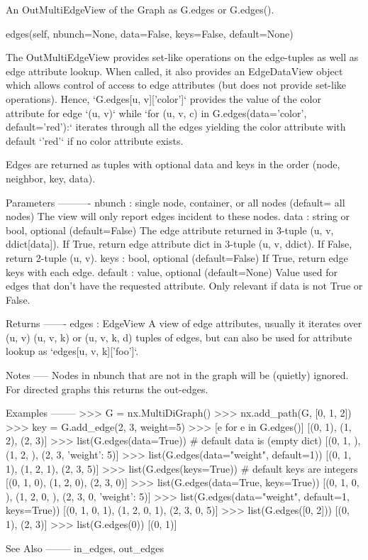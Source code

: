 \begin{DoxyVerb}An OutMultiEdgeView of the Graph as G.edges or G.edges().

edges(self, nbunch=None, data=False, keys=False, default=None)

The OutMultiEdgeView provides set-like operations on the edge-tuples
as well as edge attribute lookup. When called, it also provides
an EdgeDataView object which allows control of access to edge
attributes (but does not provide set-like operations).
Hence, `G.edges[u, v]['color']` provides the value of the color
attribute for edge `(u, v)` while
`for (u, v, c) in G.edges(data='color', default='red'):`
iterates through all the edges yielding the color attribute
with default `'red'` if no color attribute exists.

Edges are returned as tuples with optional data and keys
in the order (node, neighbor, key, data).

Parameters
----------
nbunch : single node, container, or all nodes (default= all nodes)
    The view will only report edges incident to these nodes.
data : string or bool, optional (default=False)
    The edge attribute returned in 3-tuple (u, v, ddict[data]).
    If True, return edge attribute dict in 3-tuple (u, v, ddict).
    If False, return 2-tuple (u, v).
keys : bool, optional (default=False)
    If True, return edge keys with each edge.
default : value, optional (default=None)
    Value used for edges that don't have the requested attribute.
    Only relevant if data is not True or False.

Returns
-------
edges : EdgeView
    A view of edge attributes, usually it iterates over (u, v)
    (u, v, k) or (u, v, k, d) tuples of edges, but can also be
    used for attribute lookup as `edges[u, v, k]['foo']`.

Notes
-----
Nodes in nbunch that are not in the graph will be (quietly) ignored.
For directed graphs this returns the out-edges.

Examples
--------
>>> G = nx.MultiDiGraph()
>>> nx.add_path(G, [0, 1, 2])
>>> key = G.add_edge(2, 3, weight=5)
>>> [e for e in G.edges()]
[(0, 1), (1, 2), (2, 3)]
>>> list(G.edges(data=True))  # default data is {} (empty dict)
[(0, 1, {}), (1, 2, {}), (2, 3, {'weight': 5})]
>>> list(G.edges(data="weight", default=1))
[(0, 1, 1), (1, 2, 1), (2, 3, 5)]
>>> list(G.edges(keys=True))  # default keys are integers
[(0, 1, 0), (1, 2, 0), (2, 3, 0)]
>>> list(G.edges(data=True, keys=True))
[(0, 1, 0, {}), (1, 2, 0, {}), (2, 3, 0, {'weight': 5})]
>>> list(G.edges(data="weight", default=1, keys=True))
[(0, 1, 0, 1), (1, 2, 0, 1), (2, 3, 0, 5)]
>>> list(G.edges([0, 2]))
[(0, 1), (2, 3)]
>>> list(G.edges(0))
[(0, 1)]

See Also
--------
in_edges, out_edges
\end{DoxyVerb}
